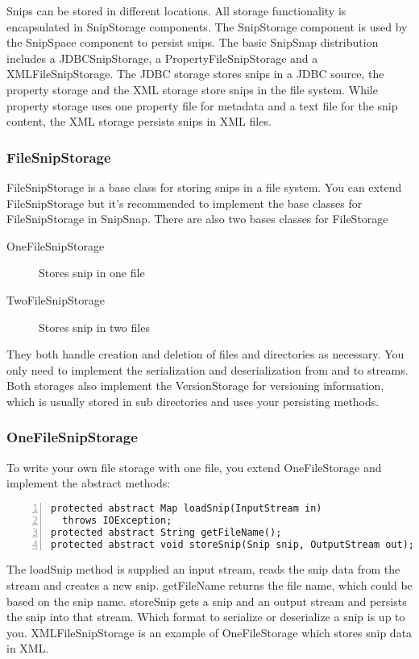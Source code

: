 \documentclass[a4paper,pdftex]{article}
\begin{document}
Snips can be stored in different locations. All storage functionality
is encapsulated in SnipStorage components. The SnipStorage component is used
by the SnipSpace component to persist snips. The basic SnipSnap distribution
includes a JDBCSnipStorage, a PropertyFileSnipStorage and a XMLFileSnipStorage.
The JDBC storage stores snips in a JDBC source, the property storage and the XML storage
store snips in the file system. While property storage uses one property file for metadata and
a text file for the snip content, the XML storage persists snips in XML files.

\subsubsection{FileSnipStorage}

FileSnipStorage is a base class for storing snips in a file system.
You can extend FileSnipStorage but it's recommended to implement
the base classes for FileSnipStorage in SnipSnap. There are also two bases 
classes for FileStorage

\begin{description}
\item[OneFileSnipStorage]Stores snip in one file
\item[TwoFileSnipStorage]Stores snip in two files
\end{description}

They both handle creation and deletion of files and directories as necessary.
You only need to implement the serialization and deserialization from and to
streams. Both storages also implement the VersionStorage for versioning
information, which is usually stored in sub directories and uses your
persisting methods.

\subsubsection{OneFileSnipStorage}

To write your own file storage with one file, you extend
OneFileStorage and implement the abstract methods:

\begin{Verbatim}[gobble=0,frame=single,numbers=left,fontsize=\small]
protected abstract Map loadSnip(InputStream in)
  throws IOException;
protected abstract String getFileName();
protected abstract void storeSnip(Snip snip, OutputStream out);
\end{Verbatim}

The loadSnip method is supplied an input stream, reads the snip data from the stream
and creates a new snip. getFileName returns the file name, which could be based
on the snip name. storeSnip gets a snip and an output stream and persists the
snip into that stream. Which format to serialize or deserialize a snip is up to you.
XMLFileSnipStorage is an example of OneFileStorage which stores snip data 
in XML.
 
\end{document}
